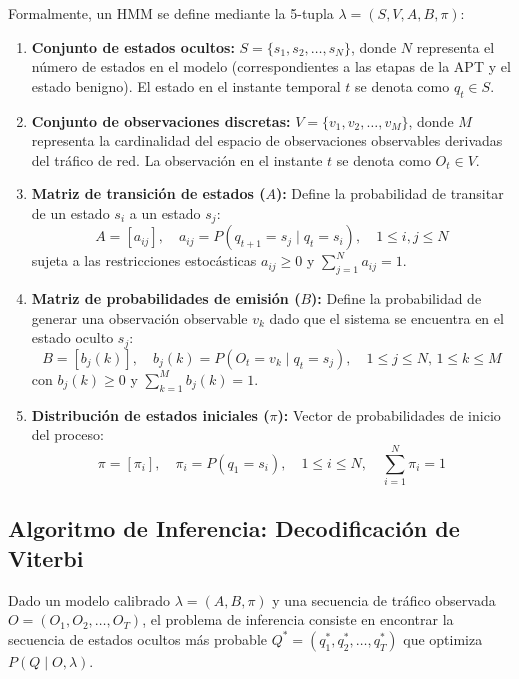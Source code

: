 Formalmente, un HMM se define mediante la 5-tupla $\lambda = (S, V, A, B, \pi)$:
\begin{enumerate}
    \item \textbf{Conjunto de estados ocultos:} $S = \{s_1, s_2, \dots, s_N\}$, donde $N$ representa el número de estados en el modelo (correspondientes a las etapas de la APT y el estado benigno). El estado en el instante temporal $t$ se denota como $q_t \in S$.
    \item \textbf{Conjunto de observaciones discretas:} $V = \{v_1, v_2, \dots, v_M\}$, donde $M$ representa la cardinalidad del espacio de observaciones observables derivadas del tráfico de red. La observación en el instante $t$ se denota como $O_t \in V$.
    \item \textbf{Matriz de transición de estados ($A$):} Define la probabilidad de transitar de un estado $s_i$ a un estado $s_j$:
    \begin{equation}
    A = [a_{ij}], \quad a_{ij} = P(q_{t+1} = s_j \mid q_t = s_i), \quad 1 \le i, j \le N
    \end{equation}
    sujeta a las restricciones estocásticas $a_{ij} \ge 0$ y $\sum_{j=1}^N a_{ij} = 1$.
    \item \textbf{Matriz de probabilidades de emisión ($B$):} Define la probabilidad de generar una observación observable $v_k$ dado que el sistema se encuentra en el estado oculto $s_j$:
    \begin{equation}
    B = [b_j(k)], \quad b_j(k) = P(O_t = v_k \mid q_t = s_j), \quad 1 \le j \le N, \, 1 \le k \le M
    \end{equation}
    con $b_j(k) \ge 0$ y $\sum_{k=1}^M b_j(k) = 1$.
    \item \textbf{Distribución de estados iniciales ($\pi$):} Vector de probabilidades de inicio del proceso:
    \begin{equation}
    \pi = [\pi_i], \quad \pi_i = P(q_1 = s_i), \quad 1 \le i \le N, \quad \sum_{i=1}^N \pi_i = 1
    \end{equation}
\end{enumerate}

\subsection{Algoritmo de Inferencia: Decodificación de Viterbi}
Dado un modelo calibrado $\lambda = (A, B, \pi)$ y una secuencia de tráfico observada $O = (O_1, O_2, \dots, O_T)$, el problema de inferencia consiste en encontrar la secuencia de estados ocultos más probable $Q^* = (q_1^*, q_2^*, \dots, q_T^*)$ que optimiza $P(Q \mid O, \lambda)$. 

